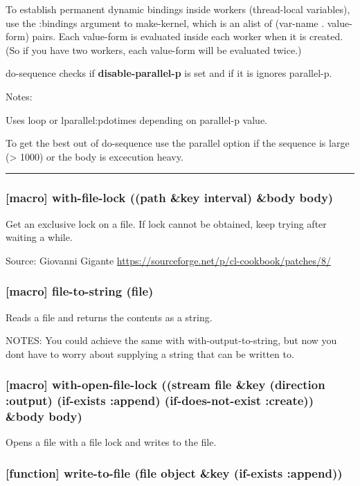 \documentclass[11pt]{article}
\begin{document}
To establish permanent dynamic bindings inside workers (thread-local
variables), use the :bindings argument to make-kernel, which is an
alist of (var-name . value-form) pairs. Each value-form is evaluated
inside each worker when it is created. (So if you have two workers,
each value-form will be evaluated twice.)

do-sequence checks if \textbf{disable-parallel-p} is set and if it is ignores
parallel-p.

Notes:

Uses loop or lparallel:pdotimes depending on parallel-p value.

To get the best out of do-sequence use the parallel option if the
sequence is large (> 1000) or the body is excecution heavy.

\noindent\rule{\textwidth}{0.5pt}

\subsubsection{[macro] with-file-lock ((path \&key interval) \&body body)}
\label{sec:orgf0a6dfb}

Get an exclusive lock on a file. If lock cannot be obtained, keep
trying after waiting a while.

Source: Giovanni Gigante \url{https://sourceforge.net/p/cl-cookbook/patches/8/}

\subsubsection{[macro] file-to-string (file)}
\label{sec:orgfdfb004}

Reads a file and returns the contents as a string.

NOTES: You could achieve the same with with-output-to-string, but now
you dont have to worry about supplying a string that can be written
to.

\subsubsection{[macro] with-open-file-lock ((stream file \&key (direction :output) (if-exists :append) (if-does-not-exist :create)) \&body body)}
\label{sec:orgb2add40}

Opens a file with a file lock and writes to the file.

\subsubsection{[function] write-to-file (file object \&key (if-exists :append))}
\label{sec:org5df153b}
\end{document}
